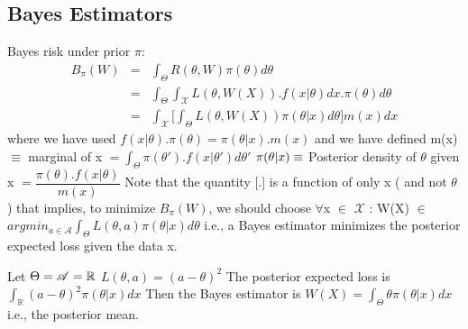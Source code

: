 \documentclass[a4paper,english,12pt]{article}
\begin{document}
\subsection{Bayes Estimators}
Bayes risk under prior $\pi$:
\begin{eqnarray}
B_\pi(W) &=& \int_{\Theta}^{}R(\theta,W)\pi(\theta)d\theta \\
&=& \int_{\Theta}^{}\int_{\mathscr{X}}^{} L(\theta,W(X)).f(x\vert\theta)dx.\pi(\theta)d\theta \\
&=& \int_{\mathscr{X}}^{}\bigg[\int_{\Theta}^{}L(\theta,W(X))\pi(\theta\vert x)d\theta\bigg]m(x)dx
\end{eqnarray}
\newline \hspace*{2cm} where we have used $f(x\vert\theta).\pi(\theta) = \pi(\theta\vert x).m(x) $
\vspace*{5mm}\newline and we have defined
\newline \hspace*{23mm} m(x) $\equiv$ marginal of x
\newline \hspace*{33mm} $ = \int_{\Theta}^{}\pi(\theta').f(x\vert\theta')d\theta' $
\vspace*{3mm}\newline \hspace*{21mm} $\pi(\theta\vert x)\space\equiv$ Posterior density of $\theta$ given x
\newline \hspace*{34mm} $ = \dfrac{\pi(\theta).f(x\vert\theta)}{m(x)} $
\vspace*{5mm}\newline Note that the quantity [.] is a function of only x ( and not $\theta$)
\vspace*{3mm}\newline that implies, to minimize $B_\pi(W)$, we should choose
\newline\hspace*{2cm} $\forall$x $\in$ $\mathscr{X}$ : W(X) $\in$ $argmin_{a\in\mathscr{A}} \int_{\Theta}^{}L(\theta,a)\pi(\theta\vert x)d\theta $
\vspace*{3mm}\newline i.e., a Bayes estimator minimizes the posterior expected loss given the data x.
\vspace*{5mm}
\begin{exmp}
	Let $\Theta\space=\space\mathscr{A}\space=\space\mathbb{R}$
	\newline\hspace*{2cm} $L(\theta,a) = (a-\theta)^2$
	\newline The posterior expected loss is
	\newline \hspace*{2cm} $\int_{\mathbb{R}}^{}(a-\theta)^2\pi(\theta\vert x)dx$
	\newline Then the Bayes estimator is $W(X) = \int_{\Theta}^{}\theta\pi(\theta\vert x)dx $
	\newline i.e., the posterior mean.
\end{exmp}
\end{document}
